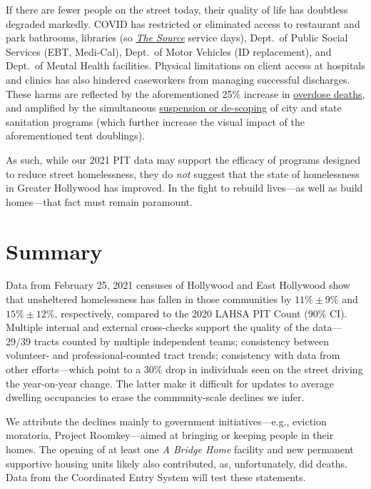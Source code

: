 \documentclass[11pt,twocolumn]{article}
\def\resp{respectively}
\begin{document}
If there are fewer people on the street today, their quality of life has doubtless degraded markedly. 
COVID has restricted or eliminated access to restaurant and park bathrooms, libraries (so 
\href{https://www.lapl.org/homeless-resources/the-source}{\it The Source} service days), Dept.~of Public Social Services 
(EBT, Medi-Cal), Dept.~of Motor Vehicles (ID replacement), and Dept.~of Mental Health facilities. Physical limitations 
on client access at hospitals and clinics has also hindered caseworkers from managing successful discharges. These 
harms are reflected by the aforementioned 25\% increase in 
\href{https://www.latimes.com/california/story/2021-01-07/the-powerful-synthetic-opioid-fentanyl-is-behind-rising-deaths-in-the-homeless-population}{overdose deaths}, and amplified by the simultaneous 
\href{https://clkrep.lacity.org/onlinedocs/2020/20-0147_misc_3-17-20_p.pdf} {suspension or de-scoping} of city 
and state sanitation programs (which further increase the visual impact of the aforementioned 
tent doublings). 

As such, while our 2021 PIT data may support the efficacy of programs designed to reduce street 
homelessness, they do {\it not} suggest that the state of homelessness in Greater Hollywood has improved. 
In the fight to rebuild lives---as well as build homes---that fact must remain paramount.

\section{Summary}
\label{sec:summary}

Data from February 25, 2021 censuses of Hollywood and East Hollywood show that 
unsheltered homelessness has fallen in those communities by $11\%\pm9\%$ and 
$15\%\pm12\%$, \resp, compared to the 2020 LAHSA PIT Count (90\% CI). 
Multiple internal and external cross-checks support the quality of the data---29/39 tracts
counted by multiple independent teams; consistency between volunteer- and 
professional-counted tract trends; consistency with data from other efforts---which
point to a 30\% drop in individuals seen on the street driving the year-on-year change.
The latter make it difficult for updates to average dwelling occupancies to erase the 
community-scale declines we infer. 

We attribute the declines mainly to government initiatives---e.g., eviction moratoria, Project 
Roomkey---aimed at bringing or keeping people in their homes. The opening of at least one {\it A Bridge Home} 
facility and new permanent supportive housing units likely also contributed, as, unfortunately, 
did deaths. Data from the Coordinated Entry System will test these statements.
\end{document}
